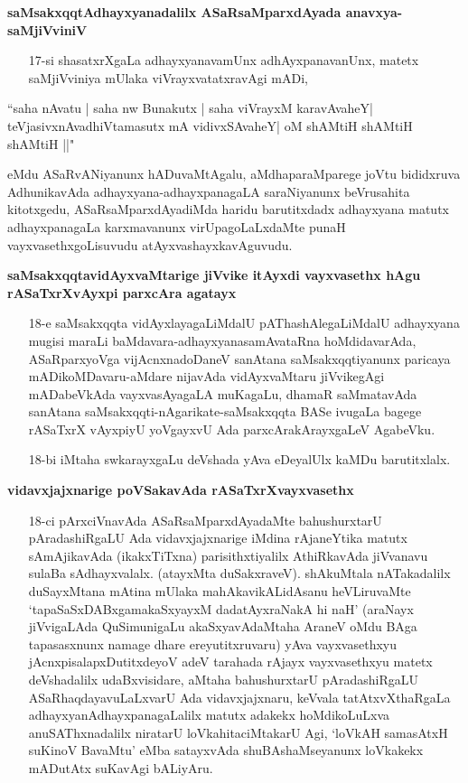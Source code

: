 \textbf{saMsakxqqtAdhayxyanadalilx ASaRsaMparxdAyada anavxya-saMjiVviniV}

\begin{itemize}
\item[17-si] shasatxrXgaLa adhayxyanavamUnx adhAyxpanavanUnx, matetx saMjiVviniya mUlaka viVrayxvatatxravAgi mADi,
\end{itemize}

\begin{shloka}
``saha nAvatu | saha nw Bunakutx | saha viVrayxM karavAvaheY|\\
teVjasivxnAvadhiVtamasutx mA vidivxSAvaheY| oM shAMtiH shAMtiH shAMtiH ||"
\end{shloka}

eMdu ASaRvANiyanunx hADuvaMtAgalu, aMdhaparaMparege joVtu bididxruva AdhunikavAda adhayxyana-adhayxpanagaLA saraNiyanunx beVrusahita kitotxgedu, ASaRsaMparxdAyadiMda haridu barutitxdadx adhayxyana matutx adhayxpanagaLa karxmavanunx virUpagoLaLxdaMte punaH vayxvasethxgoLisuvudu atAyxvashayxkavAguvudu.

\textbf{saMsakxqqtavidAyxvaMtarige jiVvike itAyxdi vayxvasethx hAgu rASaTxrXvAyxpi parxcAra agatayx}

\begin{itemize}
\item[18-e] saMsakxqqta vidAyxlayagaLiMdalU pAThashAlegaLiMdalU adhayxyana mugisi maraLi baMdavara-adhayxyanasamAvataRna hoMdidavarAda, ASaRparxyoVga vijAcnxnadoDaneV sanAtana saMsakxqqtiyanunx paricaya mADikoMDavaru-aMdare nijavAda vidAyxvaMtaru jiVvikegAgi mADabeVkAda vayxvasAyagaLA muKagaLu, dhamaR saMmatavAda sanAtana saMsakxqqti-nAgarikate-saMsakxqqta BASe ivugaLa bagege rASaTxrX vAyxpiyU yoVgayxvU Ada parxcArakArayxgaLeV AgabeVku.

\item[18-bi] iMtaha swkarayxgaLu deVshada yAva eDeyalUlx kaMDu barutitxlalx.
\end{itemize}

\textbf{vidavxjajxnarige poVSakavAda rASaTxrXvayxvasethx}

\begin{itemize}
\item[18-ci] pArxciVnavAda ASaRsaMparxdAyadaMte bahushurxtarU pAradashiRgaLU Ada vidavxjajxnarige iMdina rAjaneYtika matutx sAmAjikavAda (ikakxTiTxna) parisithxtiyalilx AthiRkavAda jiVvanavu sulaBa sAdhayxvalalx. (atayxMta duSakxraveV). shAkuMtala nATakadalilx duSayxMtana mAtina mUlaka mahAkavikALidAsanu heVLiruvaMte `tapaSaSxDABxgamakaSxyayxM dadatAyxraNakA hi naH' (araNayx jiVvigaLAda QuSimunigaLu akaSxyavAdaMtaha AraneV oMdu BAga tapasasxnunx namage dhare ereyutitxruvaru) yAva vayxvasethxyu jAcnxpisalapxDutitxdeyoV adeV tarahada rAjayx vayxvasethxyu matetx deVshadalilx udaBxvisidare, aMtaha bahushurxtarU pAradashiRgaLU ASaRhaqdayavuLaLxvarU Ada vidavxjajxnaru, keVvala tatAtxvXthaRgaLa adhayxyanAdhayxpanagaLalilx matutx adakekx hoMdikoLuLxva anuSAThxnadalilx niratarU loVkahitaciMtakarU Agi, `loVkAH samasAtxH suKinoV BavaMtu' eMba satayxvAda shuBAshaMseyanunx loVkakekx mADutAtx suKavAgi bALiyAru.
\end{itemize}

